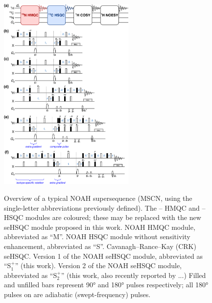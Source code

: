 \documentclass[11pt]{article}
\newcommand*{\noahSpa}{S$^+_1$}
\newcommand*{\noahSpb}{S$^+_2$}
\newcommand*{\hl}[1]{\textcolor{WildStrawberry}{#1}}
\newcommand*{\carbon}{\ce{^{13}C}}
\newcommand*{\proton}{\ce{^{1}H}}
\newcommand*{\nitrogen}{\ce{^{15}N}}
\begin{document}
\begin{figure}
    \centering
    \includegraphics[width=0.6\textwidth]{pprogs.png}
    {\label{fig:pprogs_overview}}
    {\label{fig:pprogs_hmqc}}
    {\label{fig:pprogs_hsqc}}
    {\label{fig:pprogs_crk}}
    {\label{fig:pprogs_spv1}}
    {\label{fig:pprogs_spv2}}
    \caption{
        \textbf{} Overview of a typical NOAH supersequence (MSCN, using the single-letter abbreviations previously defined\autocite{Kupce2017ACIE}).
        The \nitrogen{}--\proton{} HMQC and \carbon{}--\proton{} HSQC modules are coloured; these may be replaced with the new seHSQC module proposed in this work.
        \textbf{} NOAH HMQC module,\autocite{Kupce2017ACIE, Kupce2007MRC} abbreviated as ``M''.
        \textbf{} NOAH HSQC module without sensitivity enhancement,\autocite{Kupce2017ACIE, Schulze-Sunninghausen2017JMR} abbreviated as ``S''.
        \textbf{} Cavanagh--Rance--Kay (CRK) seHSQC.\autocite{sehsqc}
        \textbf{} Version 1 of the NOAH seHSQC module, abbreviated as ``\noahSpa{}'' (this work).
        \textbf{} Version 2 of the NOAH seHSQC module, abbreviated as ``\noahSpb{}'' (this work, \hl{also recently reported by ...})
        Filled and unfilled bars represent \ang{90} and \ang{180} pulses respectively; all \ang{180} pulses on \carbon{} are adiabatic (swept-frequency) pulses.
}
\end{figure}
\end{document}

